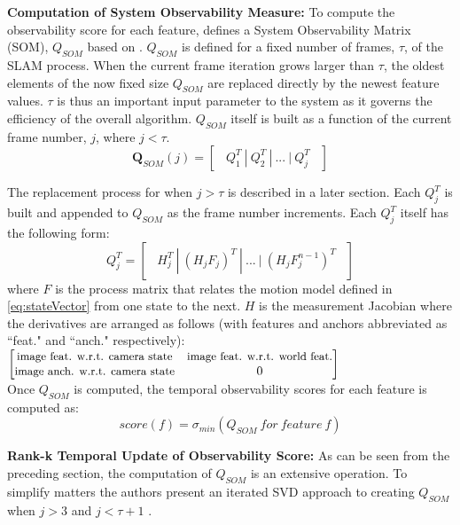 \documentclass[10pt,twocolumn,letterpaper]{article}
\begin{document}
\textbf{Computation of System Observability Measure:} To compute the observability score for each feature,
\cite{Zhang_2015_CVPR} defines a System Observability Matrix (SOM), ${Q}_{SOM}$ based on \cite{gf15}. ${Q}_{SOM}$ is defined for a fixed number 
of frames, $\tau$, of the SLAM process. When the current frame iteration grows larger than $\tau$, the oldest
 elements of the now fixed size ${Q}_{SOM}$ are replaced directly by the newest feature values. $\tau$ is 
 thus an important input parameter to the system as it governs the efficiency of the overall algorithm. 
 ${Q}_{SOM}$ itself is built as a function of the current frame number, $j$, where 
 $j<\tau$. 
\begin{equation} \label{eq:qsom}
\boldsymbol{Q}_{SOM}(j) = \begin{bmatrix} \ \ Q_1^T \ | \ Q_2^T \ | \ ... \ | \ Q_j^T  \ \ \end{bmatrix}
\end{equation}

The replacement process for when $j>\tau$ is described in a later section. Each $Q_j^T$ is built and appended to ${Q}_{SOM}$ as the frame number increments. Each $Q_j^T$ itself has the following form: 
\begin{equation} \label{eq:Qjjj}
Q_j^T = \begin{bmatrix} \ \ H_j^T \ | \ (H_j F_j)^T \ | \ ... \ | \ (H_j F_j^{n-1})^T  \ \ \end{bmatrix}
\end{equation}
where $F$ is the process matrix that relates the motion model defined in \eqref{eq:stateVector} 
from one state to the next. $H$ is the measurement Jacobian where the derivatives are arranged as follows (with features and anchors abbreviated as ``feat." and ``anch." respectively):
\noindent{}$\begin{bmatrix}
\small{\text{image feat. w.r.t. camera state}}&\small{\text{image feat. w.r.t. world feat.}}\\
\small{\text{image anch. w.r.t. camera state}}&0
\end{bmatrix}$\\

Once $Q_{SOM}$ is computed, the temporal observability scores for each feature is computed as:
\begin{equation} \label{eq:Qjjj}
score(f) = \sigma_{min}(Q_{SOM} \ for \ feature \ f)
\end{equation}

\textbf{Rank-k Temporal Update of Observability Score:} As can be seen from the preceding section, the computation of $Q_{SOM}$ is an extensive operation. To simplify matters the authors present an iterated SVD approach to creating $Q_{SOM}$ when $j>3$  and $j<\tau + 1$ . 
\end{document}
